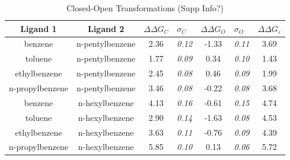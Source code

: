 \documentclass[T4paper.tex]{subfiles}
\begin{document}
\begin{table}[!htb]
\centering
\caption{Closed-Open Transformations (Supp Info?)}
\label{tbl:C-O}
\begin{tabular}{|c|c|c|l|c|l|c|}
\hline
\textbf{Ligand 1}       & \textbf{Ligand 2}    & {\color[HTML]{800080} \boldmath$\Delta\Delta G_{C}$} & {\color[HTML]{800080} \boldmath$\sigma_{C}$} & {\color[HTML]{008000} \boldmath$\Delta\Delta G_{O}$} & {\color[HTML]{008000} \boldmath$\sigma_{O}$} & \boldmath$\Delta\Delta G_{\varepsilon}$ \\ \hline
\cellcolor[HTML]{800080}benzene         & \cellcolor[HTML]{008000}n-pentylbenzene & 2.36                                   & \textit{0.12}                       & -1.33                                & \textit{0.11}                       & \cellcolor[HTML]{FFCCC9}3.69 \\ \hline
\cellcolor[HTML]{800080}toluene         & \cellcolor[HTML]{008000}n-pentylbenzene & 1.77                                   & \textit{0.09}                       & 0.34                                 & \textit{0.10}                       & \cellcolor[HTML]{FFCCC9}1.43 \\ \hline
\cellcolor[HTML]{800080}ethylbenzene    & \cellcolor[HTML]{008000}n-pentylbenzene & 2.45                                   & \textit{0.08}                       & 0.46                                 & \textit{0.09}                       & \cellcolor[HTML]{FFCCC9}1.99 \\ \hline
\cellcolor[HTML]{800080}n-propylbenzene & \cellcolor[HTML]{008000}n-pentylbenzene & 3.46                                   & \textit{0.08}                       & -0.22                                & \textit{0.08}                       & \cellcolor[HTML]{FFCCC9}3.68 \\ \hline
\cellcolor[HTML]{800080}benzene         & \cellcolor[HTML]{008000}n-hexylbenzene  & 4.13                                   & \textit{0.16}                       & -0.61                                & \textit{0.15}                       & \cellcolor[HTML]{FFCCC9}4.74 \\ \hline
\cellcolor[HTML]{800080}toluene         & \cellcolor[HTML]{008000}n-hexylbenzene  & 2.90                                   & \textit{0.14}                       & -1.63                                & \textit{0.08}                       & \cellcolor[HTML]{FFCCC9}4.53 \\ \hline
\cellcolor[HTML]{800080}ethylbenzene    & \cellcolor[HTML]{008000}n-hexylbenzene  & 3.63                                   & \textit{0.11}                       & -0.76                                & \textit{0.09}                       & \cellcolor[HTML]{FFCCC9}4.39 \\ \hline
\cellcolor[HTML]{800080}n-propylbenzene & \cellcolor[HTML]{008000}n-hexylbenzene  & 5.85                                   & \textit{0.10}                       & 0.13                                 & \textit{0.06}                       & \cellcolor[HTML]{FFCCC9}5.72 \\ \hline
\end{tabular}

\end{table}
\end{document}
